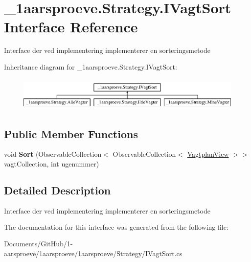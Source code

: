 \hypertarget{interface__1aarsproeve_1_1_strategy_1_1_i_vagt_sort}{}\section{\+\_\+1aarsproeve.\+Strategy.\+I\+Vagt\+Sort Interface Reference}
\label{interface__1aarsproeve_1_1_strategy_1_1_i_vagt_sort}


Interface der ved implementering implementerer en sorteringsmetode  


Inheritance diagram for \+\_\+1aarsproeve.\+Strategy.\+I\+Vagt\+Sort\+:\begin{figure}[H]
\begin{center}
\leavevmode
\includegraphics[height=1.696970cm]{interface__1aarsproeve_1_1_strategy_1_1_i_vagt_sort}
\end{center}
\end{figure}
\subsection*{Public Member Functions}
\begin{DoxyCompactItemize}
\item 
\hypertarget{interface__1aarsproeve_1_1_strategy_1_1_i_vagt_sort_a2faa6866b569d37c3efc08da49adaa30}{}void {\bfseries Sort} (Observable\+Collection$<$ Observable\+Collection$<$ \hyperlink{class__1aarsproeve_1_1_model_1_1_vagtplan_view}{Vagtplan\+View} $>$$>$ vagt\+Collection, int ugenummer)\label{interface__1aarsproeve_1_1_strategy_1_1_i_vagt_sort_a2faa6866b569d37c3efc08da49adaa30}

\end{DoxyCompactItemize}


\subsection{Detailed Description}
Interface der ved implementering implementerer en sorteringsmetode 



The documentation for this interface was generated from the following file\+:\begin{DoxyCompactItemize}
\item 
Documents/\+Git\+Hub/1-\/aarsproeve/1aarsproeve/1aarsproeve/\+Strategy/I\+Vagt\+Sort.\+cs\end{DoxyCompactItemize}
